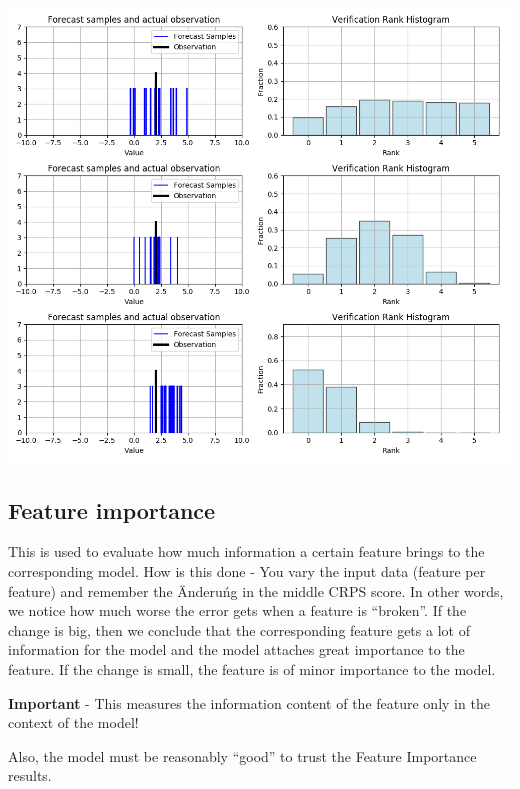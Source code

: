 \documentclass[margin=0.01in]{article}
\begin{document}
\begin{center}
\includegraphics[width=.9\linewidth]{../images/verification_histogram.png}
\end{center}


\subsection{Feature importance}
\label{sec:orgfee9d1d}
This is used to evaluate how much information a certain feature brings to the corresponding model. How is this done - You vary the input data (feature per feature) and remember the Änderuńg in the middle CRPS score. In other words, we notice how much worse the error gets when a feature is ``broken''. If the change is big, then we conclude that the corresponding feature gets a lot of information for the model and the model attaches great importance to the feature. If the change is small, the feature is of minor importance to the model.

\textbf{Important} - This measures the information content of the feature only in the context of the model!

Also, the model must be reasonably ``good'' to trust the Feature Importance results.
\end{document}
